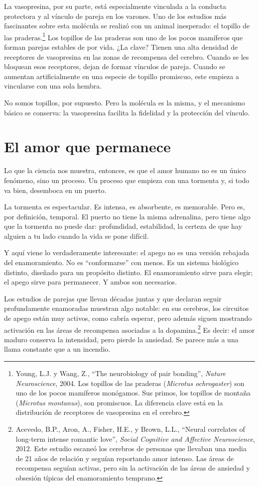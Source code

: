 La vasopresina, por su parte, está especialmente vinculada a la conducta protectora y al vínculo de pareja en los varones. Uno de los estudios más fascinantes sobre esta molécula se realizó con un animal inesperado: el topillo de las praderas.\footnote{Young, L.J. y Wang, Z., ``The neurobiology of pair bonding'', \textit{Nature Neuroscience}, 2004. Los topillos de las praderas (\textit{Microtus ochrogaster}) son uno de los pocos mamíferos monógamos. Sus primos, los topillos de montaña (\textit{Microtus montanus}), son promiscuos. La diferencia clave está en la distribución de receptores de vasopresina en el cerebro.} Los topillos de las praderas son uno de los pocos mamíferos que forman parejas estables de por vida. ¿La clave? Tienen una alta densidad de receptores de vasopresina en las zonas de recompensa del cerebro. Cuando se les bloquean esos receptores, dejan de formar vínculos de pareja. Cuando se aumentan artificialmente en una especie de topillo promiscuo, este empieza a vincularse con una sola hembra.

No somos topillos, por supuesto. Pero la molécula es la misma, y el mecanismo básico se conserva: la vasopresina facilita la fidelidad y la protección del vínculo.

\section{El amor que permanece}

Lo que la ciencia nos muestra, entonces, es que el amor humano no es un único fenómeno, sino un proceso. Un proceso que empieza con una tormenta y, si todo va bien, desemboca en un puerto.

La tormenta es espectacular. Es intensa, es absorbente, es memorable. Pero es, por definición, temporal. El puerto no tiene la misma adrenalina, pero tiene algo que la tormenta no puede dar: profundidad, estabilidad, la certeza de que hay alguien a tu lado cuando la vida se pone difícil.

Y aquí viene lo verdaderamente interesante: el apego no es una versión rebajada del enamoramiento. No es ``conformarse'' con menos. Es un sistema biológico distinto, diseñado para un propósito distinto. El enamoramiento sirve para elegir; el apego sirve para permanecer. Y ambos son necesarios.

Los estudios de parejas que llevan décadas juntas y que declaran seguir profundamente enamoradas muestran algo notable: en sus cerebros, los circuitos de apego están muy activos, como cabría esperar, pero además siguen mostrando activación en las áreas de recompensa asociadas a la dopamina.\footnote{Acevedo, B.P., Aron, A., Fisher, H.E., y Brown, L.L., ``Neural correlates of long-term intense romantic love'', \textit{Social Cognitive and Affective Neuroscience}, 2012. Este estudio escaneó los cerebros de personas que llevaban una media de 21 años de relación y seguían reportando amor intenso. Las áreas de recompensa seguían activas, pero sin la activación de las áreas de ansiedad y obsesión típicas del enamoramiento temprano.} Es decir: el amor maduro conserva la intensidad, pero pierde la ansiedad. Se parece más a una llama constante que a un incendio.

